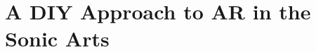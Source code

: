 \chapter{A DIY Approach to AR in the Sonic Arts}
\label{sec: method}
\epigraph{\emph{}}{}
\clearpage
